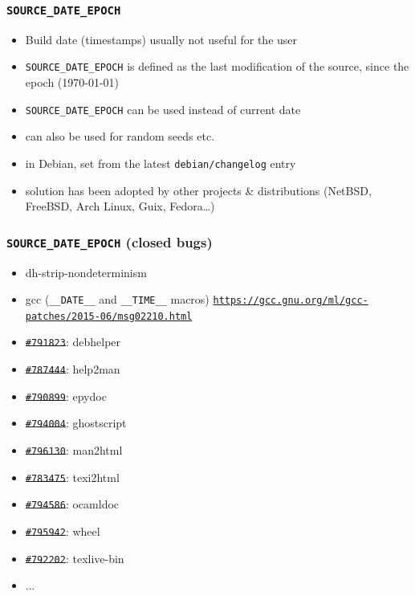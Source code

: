 \documentclass[14pt]{beamer}
\begin{document}
\begin{frame}
 \frametitle{\texttt{SOURCE\_DATE\_EPOCH}}

 \begin{itemize}
  \item Build date (timestamps) usually not useful for the user
  \item<2-3> \texttt{SOURCE\_DATE\_EPOCH} is defined as the last modification of
  the source, since the epoch (1970-01-01)
  \item<2-3> \texttt{SOURCE\_DATE\_EPOCH} can be used instead of current date
  \item<2-3> can also be used for random seeds etc.
  \item<3> in Debian, set from the latest \texttt{debian/changelog} entry
  \item<3> solution has been adopted by other projects \& distributions
  (NetBSD, FreeBSD, Arch Linux, Guix, Fedora…)
 \end{itemize}
\end{frame}


\begin{frame}
 \frametitle{\texttt{SOURCE\_DATE\_EPOCH} (closed bugs)}

 \begin{itemize}
  \item dh-strip-nondeterminism
  \item gcc (\texttt{\_\_DATE\_\_} and \texttt{\_\_TIME\_\_} macros) \texttt{\footnotesize{\url{https://gcc.gnu.org/ml/gcc-patches/2015-06/msg02210.html}}}
  \item \sout{\texttt{\#791823}}: debhelper
  \item \sout{\texttt{\#787444}}: help2man
  \item \sout{\texttt{\#790899}}: epydoc
  \item \sout{\texttt{\#794004}}: ghostscript
  \item \sout{\texttt{\#796130}}: man2html
  \item \sout{\texttt{\#783475}}: texi2html
  \item \sout{\texttt{\#794586}}: ocamldoc
  \item \sout{\texttt{\#795942}}: wheel
  \item \sout{\texttt{\#792202}}: texlive-bin
  \item ...
 \end{itemize}
\end{frame}
\end{document}
